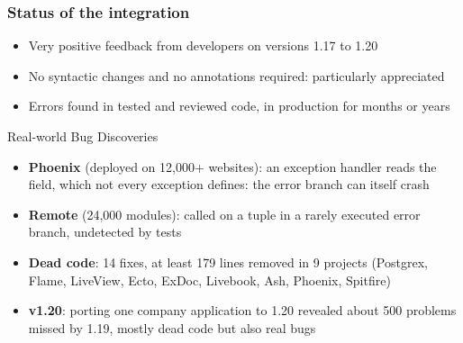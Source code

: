 

\begin{frame}[fragile]
\frametitle{Status of the integration}\vspace{-3mm}
\begin{itemize}
\item Very positive feedback from developers on versions 1.17 to 1.20
\item No syntactic changes and no annotations required: particularly appreciated
\item Errors found in tested and reviewed code, in production for months or years
\end{itemize}

\medskip\pause

\begin{block}{Real-world Bug Discoveries}
\begin{itemize}
    \setlength{\itemsep}{0pt}
\item \textbf{Phoenix} (deployed on 12,000+ websites): an exception handler reads the  field, which not every exception defines: the error branch can itself crash
\item \textbf{Remote} (24,000 modules):  called on a tuple in a rarely executed error branch, undetected by tests
\item \textbf{Dead code}: 14 fixes, at least 179 lines removed in 9 projects (Postgrex, Flame, LiveView, Ecto, ExDoc, Livebook, Ash, Phoenix, Spitfire)
\item \textbf{v1.20}: porting one company application to 1.20 revealed about 500 problems missed by 1.19, mostly dead code but also real bugs\vspace{-1mm}
\end{itemize}
\end{block}
\end{frame}



\newcommand{\newkw}[1]{\textcolor{newsyntax}{\textbf{#1}}}

\newcommand{\bad}[1]{{\normalfont\small\textcolor{red!75!black}{\ding{55}~#1}}}
\newcommand{\good}[1]{{\normalfont\small\textcolor{typeGreen}{\ding{51}~#1}}}
\newcommand{\codeLabel}[1]{\hfill{\normalfont\scriptsize\textcolor{gray}{#1}}}
\newcommand{\fwToday}{\codeLabel{today (Elixir 1.20)}}
\newcommand{\fwTomorrow}{\codeLabel{tomorrow}}
\newcommand{\badRun}{\bad{crashes at run time}}
\newcommand{\goodUnit}{\good{error: the \texttt{unit} of \texttt{Square} is \texttt{integer()}}}
\newcommand{\goodSend}{\good{error: \texttt{true} is not an \texttt{integer()}}}
\newcommand{\goodNotInt}{\good{error: \texttt{y} is not an \texttt{integer()}}}
\newcommand{\goodKey}{\good{error: no key \texttt{:a}}}
\newcommand{\goodNum}{\good{error: \texttt{m.b} is \texttt{:ok}, not a number}}

